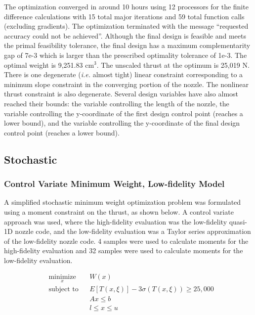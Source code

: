 \documentclass{article}
\begin{document}
The optimization converged in around 10 hours using 12 processors for the finite difference calculations with 15 total major iterations and 59 total function calls (excluding gradients). The optimization terminated with the message ``requested accuracy could not be achieved''. Although the final design is feasible and meets the primal feasibility tolerance, the final design has a maximum complementarity gap of 7e-3 which is larger than the prescribed optimality tolerance of 1e-3. The optimal weight is 9,251.83 $\textrm{cm}^3$. The unscaled thrust at the optimum is 25,019 N. There is one degenerate (\textit{i.e.} almost tight) linear constraint corresponding to a minimum slope constraint in the converging portion of the nozzle. The nonlinear thrust constraint is also degenerate. Several design variables have also almost reached their bounds: the variable controlling the length of the nozzle, the variable controlling the y-coordinate of the first design control point (reaches a lower bound), and the variable controlling the y-coordinate of the final design control point (reaches a lower bound).

\subsection{Stochastic}

\subsubsection{Control Variate Minimum Weight, Low-fidelity Model}

A simplified stochastic minimum weight optimization problem was formulated using a moment constraint on the thrust, as shown below. A control variate approach was used, where the high-fidelity evaluation was the low-fidelity quasi-1D nozzle code, and the low-fidelity evaluation was a Taylor series approximation of the low-fidelity nozzle code. 4 samples were used to calculate moments for the high-fidelity evaluation and 32 samples were used to calculate moments for the low-fidelity evaluation. 
 
\begin{equation}
\label{eq:minWeightCVLowFiSimplified}
\begin{aligned}
& \underset{x}{\text{minimize}}
& & W(x) \\
& \text{subject to}
& & E[T(x,\xi)] - 3 \sigma(T(x,\xi)) \geq 25,000 \\
& & & A x \leq b \\
& & & l \leq x \leq u \\
\end{aligned}
\end{equation}
\end{document}
